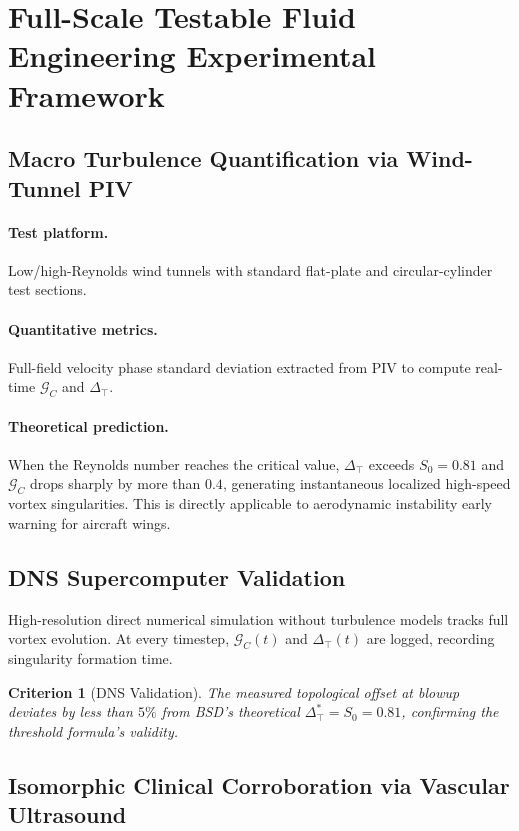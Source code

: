 \documentclass[11pt,a4paper]{article}
\newtheorem{criterion}{Criterion}
\theoremstyle{remark}
\newcommand{\Szero}{S_{0}}
\newcommand{\GC}{\mathcal{G}_{\!C}}
\newcommand{\Dtop}{\Delta_{\!\top}}
\begin{document}
\section{Full-Scale Testable Fluid Engineering Experimental Framework}\label{sec:experiment}

\subsection{Macro Turbulence Quantification via Wind-Tunnel PIV}\label{sec:piv}

\paragraph{Test platform.} Low/high-Reynolds wind tunnels with standard flat-plate and circular-cylinder test sections.

\paragraph{Quantitative metrics.} Full-field velocity phase standard deviation extracted from PIV to compute real-time $\GC$ and $\Dtop$.

\paragraph{Theoretical prediction.} When the Reynolds number reaches the critical value, $\Dtop$ exceeds $\Szero=0.81$ and $\GC$ drops sharply by more than $0.4$, generating instantaneous localized high-speed vortex singularities. This is directly applicable to aerodynamic instability early warning for aircraft wings.

\subsection{DNS Supercomputer Validation}\label{sec:dns}

High-resolution direct numerical simulation without turbulence models tracks full vortex evolution. At every timestep, $\GC(t)$ and $\Dtop(t)$ are logged, recording singularity formation time.

\begin{criterion}[DNS Validation]\label{crit:dns}
The measured topological offset at blowup deviates by less than $5\%$ from BSD's theoretical $\Dtop^{*}=\Szero=0.81$, confirming the threshold formula's validity.
\end{criterion}

\subsection{Isomorphic Clinical Corroboration via Vascular Ultrasound}\label{sec:vascular}
\end{document}
